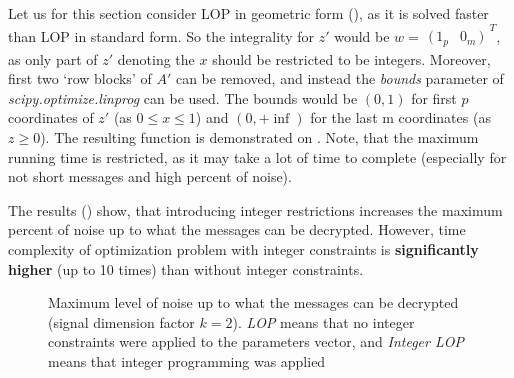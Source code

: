 \documentclass{article}
\newcommand{\irow}[1]{%
  {\begin{smallmatrix}(\,#1\,)\end{smallmatrix}}^T
}
\begin{document}
Let us for this section consider LOP in geometric form (), as it is solved faster than LOP in standard form. So the integrality for $z'$ would be $w = \irow{1_p & 0_m}$, as only part of $z'$ denoting the $x$ should be restricted to be integers. Moreover, first two `row blocks' of $A'$ can be removed, and instead the \textit{bounds} parameter of \textit{scipy.optimize.linprog} can be used. The bounds would be $(0,1)$ for first $p$ coordinates of $z'$ (as $0 \leq x \leq 1$) and $(0, +\inf)$ for the last m coordinates (as $z \geq 0$). The resulting function is demonstrated on . Note, that the maximum running time is restricted, as it may take a lot of time to complete (especially for not short messages and high percent of noise).

The results () show, that introducing integer restrictions increases the maximum percent of noise up to what the messages can be decrypted. However, time complexity of optimization problem with integer constraints is \textbf{significantly higher} (up to 10 times) than without integer constraints.


\begin{figure}[hbthbt]
  \centering
  \pgfplotsset{compat=1.10}
  \caption[Maximum level of noise up to what the messages can be decrypted (signal dimension factor $k=2$)]
  {Maximum level of noise up to what the messages can be decrypted (signal dimension factor $k=2$).
    \textit{LOP} means that no integer constraints were applied to the parameters vector, and  \textit{Integer LOP} means that integer programming was applied}\label{fig:noise_int}
\end{figure}
\end{document}
